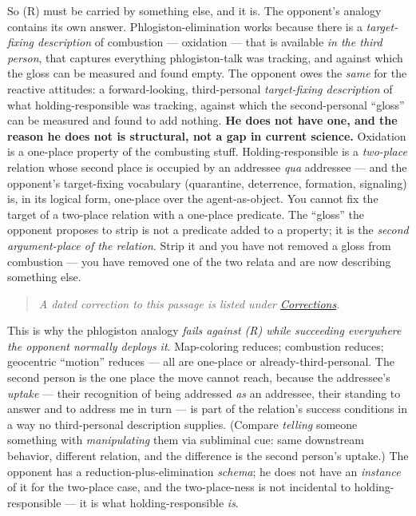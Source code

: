 \documentclass[11pt]{article}
\begin{document}
So (R) must be carried by something else, and it is. The opponent's analogy contains its own answer. Phlogiston-elimination works because there is a \emph{target-fixing description} of combustion — oxidation — that is available \emph{in the third person}, that captures everything phlogiston-talk was tracking, and against which the gloss can be measured and found empty. The opponent owes the \emph{same} for the reactive attitudes: a forward-looking, third-personal \emph{target-fixing description} of what holding-responsible was tracking, against which the second-personal ``gloss'' can be measured and found to add nothing. \textbf{He does not have one, and the reason he does not is structural, not a gap in current science.} Oxidation is a one-place property of the combusting stuff. Holding-responsible is a \emph{two-place} relation whose second place is occupied by an addressee \emph{qua} addressee — and the opponent's target-fixing vocabulary (quarantine, deterrence, formation, signaling) is, in its logical form, one-place over the agent-as-object. You cannot fix the target of a two-place relation with a one-place predicate. The ``gloss'' the opponent proposes to strip is not a predicate added to a property; it is the \emph{second argument-place of the relation}. Strip it and you have not removed a gloss from combustion — you have removed one of the two relata and are now describing something else.

\begin{quote}\small\emph{A dated correction to this passage is listed under \hyperref[corrections]{Corrections}.}\end{quote}

This is why the phlogiston analogy \emph{fails against (R) while succeeding everywhere the opponent normally deploys it}. Map-coloring reduces; combustion reduces; geocentric ``motion'' reduces — all are one-place or already-third-personal. The second person is the one place the move cannot reach, because the addressee's \emph{uptake} — their recognition of being addressed \emph{as} an addressee, their standing to answer and to address me in turn — is part of the relation's success conditions in a way no third-personal description supplies. (Compare \emph{telling} someone something with \emph{manipulating} them via subliminal cue: same downstream behavior, different relation, and the difference is the second person's uptake.) The opponent has a reduction-plus-elimination \emph{schema}; he does not have an \emph{instance} of it for the two-place case, and the two-place-ness is not incidental to holding-responsible — it is what holding-responsible \emph{is}.
\end{document}

